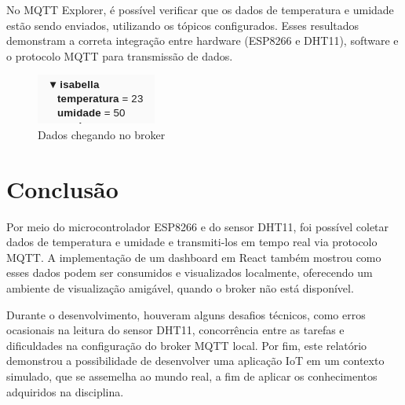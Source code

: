 \documentclass[12pt]{article}
\begin{document}
No MQTT Explorer, é possível verificar que os dados de temperatura e umidade estão sendo enviados, utilizando os tópicos configurados. Esses resultados demonstram a correta integração entre hardware (ESP8266 e DHT11), software e o protocolo MQTT para transmissão de dados.

\begin{figure}[ht]
  \centering
  \includegraphics[width=.4\textwidth]{assets/img/results2.png}
  \caption{Dados chegando no broker}
\end{figure}

\section{Conclusão}

Por meio do microcontrolador ESP8266 e do sensor DHT11, foi possível coletar dados de temperatura e umidade e transmiti-los em tempo real via protocolo MQTT. A implementação de um dashboard em React também mostrou como esses dados podem ser consumidos e visualizados localmente, oferecendo um ambiente de visualização amigável, quando o broker não está disponível.

Durante o desenvolvimento, houveram alguns desafios técnicos, como erros ocasionais na leitura do sensor DHT11, concorrência entre as tarefas e dificuldades na configuração do broker MQTT local. Por fim, este relatório demonstrou a possibilidade de desenvolver uma aplicação IoT em um contexto simulado, que se assemelha ao mundo real, a fim de aplicar os conhecimentos adquiridos na disciplina.
\end{document}
